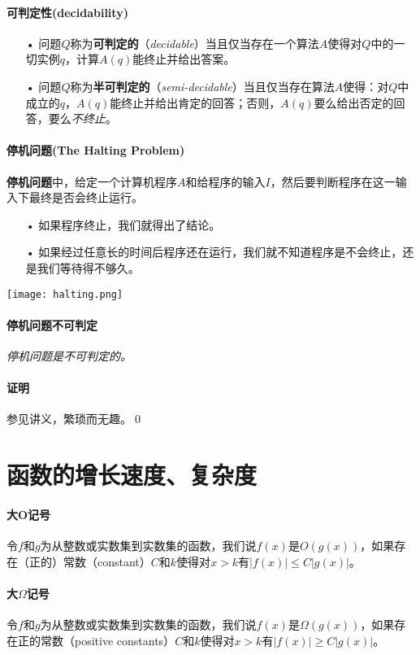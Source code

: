 \documentclass[b5paper,oneside]{ctexbook}
\begin{document}
\paragraph{可判定性(decidability)}
\begin{enumerate}
  \item[•] 问题$Q$称为\textbf{可判定的}（\emph{decidable}）当且仅当存在一个算法$A$使得对$Q$中的一切实例$q$，计算$A(q)$能终止并给出答案。
 \item[•] 问题$Q$称为\textbf{半可判定的}（\emph{semi-decidable}）当且仅当存在算法$A$使得：对$Q$中成立的$q$，$A(q)$能终止并给出肯定的回答；否则，$A(q)$要么给出否定的回答，要么\textit{不终止}。
\end{enumerate}
\paragraph{停机问题(The Halting Problem)}\textbf{停机问题}中，给定一个计算机程序$A$和给程序的输入$I$，然后要判断程序在这一输入下最终是否会终止运行。
\begin{enumerate}
\item[•]如果程序终止，我们就得出了结论。
\item[•]如果经过任意长的时间后程序还在运行，我们就不知道程序是不会终止，还是我们等待得不够久。
\end{enumerate}
\begin{center}
\texttt{[image: halting.png]}
\end{center}
\paragraph{停机问题不可判定}\textit{停机问题是不可判定的。}
\paragraph{证明}参见讲义，繁琐而无趣。\hfill\qed
\section{函数的增长速度、复杂度}
\paragraph{大O记号}令$f$和$g$为从整数或实数集到实数集的函数，我们说$f (x)$是$O(g(x))$，如果存在（正的）常数（constant）$C$和$k$使得对$x > k$有$|f (x)| \le C|g(x)|$。
\paragraph{大$\Omega$记号}令$f$和$g$为从整数或实数集到实数集的函数，我们说$f (x)$是$\Omega(g(x))$，如果存在正的常数（positive constants）$C$和$k$使得对$x > k$有$|f (x)| \ge C|g(x)|$。
\end{document}
